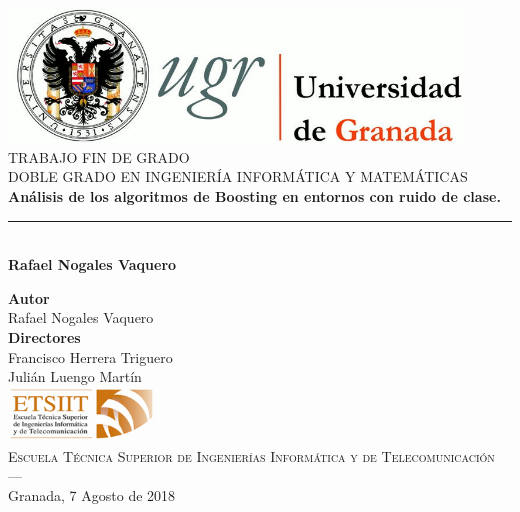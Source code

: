 \begin{titlepage}
 
 
\newlength{\centeroffset}
\setlength{\centeroffset}{-0.5\oddsidemargin}
\addtolength{\centeroffset}{0.5\evensidemargin}
\thispagestyle{empty}

\noindent\hspace*{\centeroffset}\begin{minipage}{\textwidth}

\centering
\includegraphics[width=0.9\textwidth]{imagenes/logo_ugr.jpg}\\[1.4cm]

\textsc{ \Large TRABAJO FIN DE GRADO\\[0.2cm]}
\textsc{ DOBLE GRADO EN INGENIERÍA INFORMÁTICA Y MATEMÁTICAS }\\[1cm]
% 
{\Huge\bfseries Análisis de los algoritmos de Boosting en entornos con ruido de clase.\\
}
\noindent\rule[-1ex]{\textwidth}{3pt}\\[3.5ex]
{\large\bfseries Rafael Nogales Vaquero}
\end{minipage}

\vspace{2.5cm}
\noindent\hspace*{\centeroffset}\begin{minipage}{\textwidth}
\centering

\textbf{Autor}\\ {Rafael Nogales Vaquero}\\[2.5ex]
\textbf{Directores}\\
{Francisco Herrera Triguero \\
Julián Luengo Martín}\\[2cm]
\includegraphics[width=0.3\textwidth]{imagenes/etsiit_logo.png}\\[0.1cm]
\textsc{Escuela Técnica Superior de Ingenierías Informática y de Telecomunicación}\\
\textsc{---}\\
Granada, 7 Agosto de 2018
\end{minipage}
\end{titlepage}


